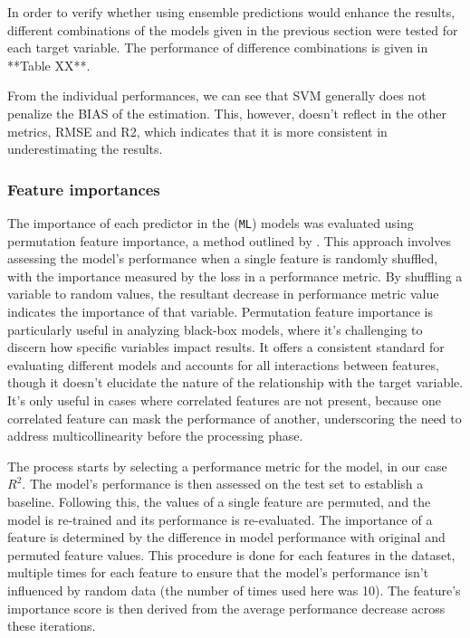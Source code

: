 \documentclass[12pt]{article}
\begin{document}
\par [Generic paragraph about ensemble theory and why it could be best than using a single model result]

\par In order to verify whether using ensemble predictions would enhance the results, different combinations of the models given in the previous section were tested for each target variable. The performance of difference combinations is given in **Table XX**. 

\par From the individual performances, we can see that SVM generally does not penalize the BIAS of the estimation. This, however, doesn't reflect in the other metrics, RMSE and R2, which indicates that it is more consistent in underestimating the results. 

\subsubsection{Feature importances} \label{sec:datagen:proceval:importance}

\par The importance of each predictor in the (\texttt{ML}) models was evaluated using permutation feature importance, a method outlined by \cite{altmann2010}. This approach involves assessing the model's performance when a single feature is randomly shuffled, with the importance measured by the loss in a performance metric. By shuffling a variable to random values, the resultant decrease in performance metric value indicates the importance of that variable. Permutation feature importance is particularly useful in analyzing black-box models, where it's challenging to discern how specific variables impact results. It offers a consistent standard for evaluating different models and accounts for all interactions between features, though it doesn't elucidate the nature of the relationship with the target variable. It's only useful in cases where correlated features are not present, because one correlated feature can mask the performance of another, underscoring the need to address multicollinearity before the processing phase.

\par The process starts by selecting a performance metric for the model, in our case \( R^2 \). The model's performance is then assessed on the test set to establish a baseline. Following this, the values of a single feature are permuted, and the model is re-trained and its performance is re-evaluated. The importance of a feature is determined by the difference in model performance with original and permuted feature values. This procedure is done for each features in the dataset, multiple times for each feature  to ensure that the model's performance isn't influenced by random data (the number of times used here was 10). The feature's importance score is then derived from the average performance decrease across these iterations.
\end{document}
